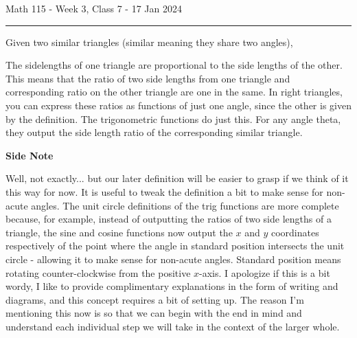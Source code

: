 \documentclass{article}
\begin{document}
Math 115 - Week 3, Class 7 - 17 Jan 2024
\hrule

\vspace{10pt}

Given two similar triangles (similar meaning they share two angles),

\begin{center}
\end{center}

The sidelengths of one triangle are proportional to the side lengths of the other. This means that the ratio of two side lengths from one triangle and corresponding ratio on the other triangle are one in the same. In right triangles, you can express these ratios as functions of just one angle, since the other is given by the definition. The trigonometric functions do just this. For any angle theta, they output the side length ratio of the corresponding similar triangle.

\vspace{10pt}

{\bf{}Side Note}

\vspace{10pt}

Well, not exactly... but our later definition will be easier to grasp if we think of it this way for now. It is useful to tweak the definition a bit to make sense for non-acute angles. The unit circle definitions of the trig functions are more complete because, for example, instead of outputting the ratios of two side lengths of a triangle, the sine and cosine functions now output the $x$ and $y$ coordinates respectively of the point where the angle in standard position intersects the unit circle - allowing it to make sense for non-acute angles. Standard position means rotating counter-clockwise from the positive $x$-axis. I apologize if this is a bit wordy, I like to provide complimentary explanations in the form of writing and diagrams, and this concept requires a bit of setting up. The reason I'm mentioning this now is so that we can begin with the end in mind and understand each individual step we will take in the context of the larger whole.
\end{document}
